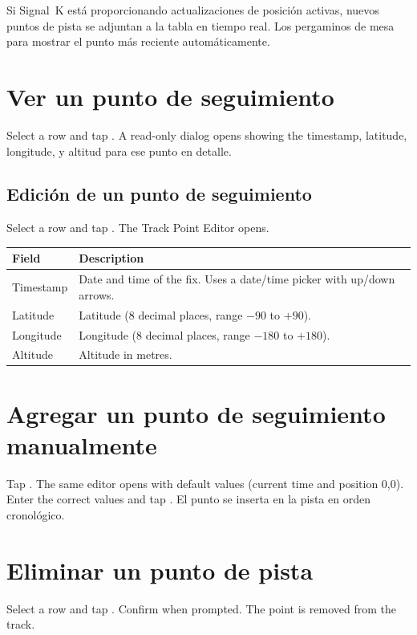 Si Signal~K está proporcionando actualizaciones de posición activas, nuevos puntos de pista se adjuntan a la tabla en
tiempo real.
Los pergaminos de mesa para mostrar el punto más reciente automáticamente.

\section{Ver un punto de seguimiento}

Select a row and tap . A read-only dialog opens showing the timestamp, latitude, longitude,
y altitud para ese punto en detalle.

\subsection{Edición de un punto de seguimiento}

Select a row and tap . The Track Point Editor opens.

\begin{longtable}{L{3cm} L{10.7cm}}
\toprule
{}
{\sffamily\bfseries\color{white} Field} &
{\sffamily\bfseries\color{white} Description} \\
\midrule
Timestamp & Date and time of the fix. Uses a date/time picker with up/down arrows. \\
Latitude & Latitude (8 decimal places, range $-90$ to $+90$). \\
Longitude & Longitude (8 decimal places, range $-180$ to $+180$). \\
Altitude & Altitude in metres. \\
\bottomrule
\end{longtable}

\section{Agregar un punto de seguimiento manualmente}

Tap . The same editor opens with default values (current time and position 0,0).
Enter the correct values and tap .
El punto se inserta en la pista en orden cronológico.

\section{Eliminar un punto de pista}

Select a row and tap . Confirm when prompted. The point is removed from the track.

